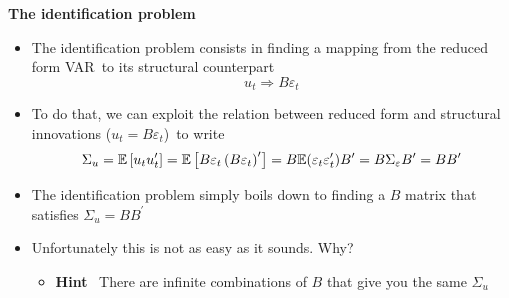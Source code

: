
\begin{frame}
{\textbf{The identification problem\medskip }}

\begin{itemize}
\item The identification problem consists in finding a mapping from the
reduced form VAR\ to its structural counterpart%
\begin{equation*}
u_{t}\Rightarrow B\varepsilon _{t}
\end{equation*}
\pause

\item To do that, we can exploit the relation between reduced form and
structural innovations ($u_{t}=B\varepsilon _{t}$)\ to write%
\begin{equation*}
\Sigma _{u}=\mathbb{E}\left[ u_{t}u_{t}^{\prime }\right] =\mathbb{E}\left[
B\varepsilon _{t}\left( B\varepsilon _{t}\right) ^{\prime }\right] =B\mathbb{%
E}(\varepsilon _{t}\varepsilon _{t}^{\prime })B^{\prime }=B\Sigma
_{\varepsilon }B^{\prime }=BB^{\prime }
\end{equation*}

\item The identification problem simply boils down to finding a $B$ matrix
that satisfies $\Sigma _{u}=BB^{\prime }$\bigskip \pause

\item Unfortunately this is not as easy as it sounds. Why?\medskip

\begin{itemize}
\item \textbf{Hint} \ There are infinite combinations of $B$ that give you
the same $\Sigma _{u}$
\end{itemize}
\end{itemize}
\end{frame}


